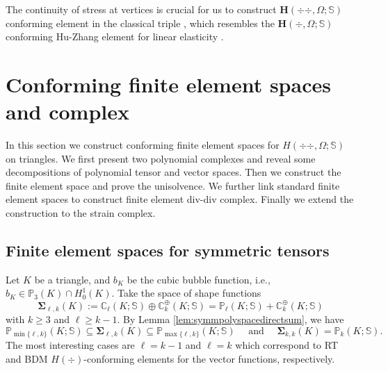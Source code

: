 The continuity of stress at vertices is crucial for us to construct $\boldsymbol{H}(\div{\div }, \Omega; \mathbb{S})$ conforming element in the classical triple \cite{Ciarlet1978}, which resembles the $\boldsymbol{H}({\div }, \Omega; \mathbb{S})$ conforming Hu-Zhang element for linear elasticity \cite{HuZhang2015}.

\section{Conforming finite element spaces and complex}
In this section we construct conforming finite element spaces for $H(\div {\div},\Omega; \mathbb S)$ on triangles. We first present two polynomial complexes and reveal some decompositions of polynomial tensor and vector spaces. Then we construct the finite element space and prove the unisolvence. We further link standard finite element spaces to construct finite element div-div complex. Finally we extend the construction to the strain complex. 


\subsection{Finite element spaces for symmetric tensors}
Let $K$ be a triangle, and $b_K$ be the cubic bubble function, i.e., $b_K\in \mathbb P_3(K)\cap H_0^1(K)$.
Take the space of shape functions
\[
\boldsymbol \Sigma_{\ell,k}(K):= \mathbb C_{\ell}(K;\mathbb S)\oplus\mathbb C_k^{\oplus}(K;\mathbb S)= \mathbb P_{\ell}(K;\mathbb S)+\mathbb C_k^{\oplus}(K;\mathbb S)
\]
with $k\geq 3$ and $\ell\geq k-1$.
 By Lemma \ref{lem:symmpolyspacedirectsum}, we have
\[
\mathbb P_{\min\{\ell,k\}}(K;\mathbb S)\subseteq\boldsymbol \Sigma_{\ell,k}(K) \subseteq \mathbb P_{\max\{\ell,k\}}(K;\mathbb S) \quad\textrm{ and }\quad \boldsymbol \Sigma_{k,k}(K)=\mathbb P_k(K;\mathbb S).
\]
The most interesting cases are $\ell=k-1$ and $\ell = k$ which correspond to RT and BDM $H(\div)$-conforming elements for the vector functions, respectively. 

